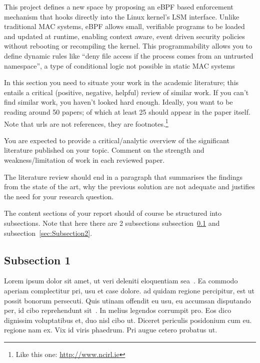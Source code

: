 This project defines a new space by proposing an eBPF based enforcement mechanism that hooks directly into the Linux kernel’s LSM interface. Unlike traditional MAC systems, eBPF allows small, verifiable programs to be loaded and updated at runtime, enabling context aware, event driven security policies without rebooting or recompiling the kernel. This programmability allows you to define dynamic rules like “deny file access if the process comes from an untrusted namespace”, a type of conditional logic not possible in static MAC systems





In this section you need to situate your work in the academic literature; this entails a critical (positive, negative, helpful) review of similar work. If you can't find similar work, you haven't looked hard enough. Ideally, you want to be reading around 50 papers; of which at least 25 should appear in the paper itself. Note that urls are not references, they are footnotes.\footnote{Like this one: \url{http://www.ncirl.ie}}

You are expected to provide a critical/analytic overview of the significant literature published on your topic. Comment on the strength and weakness/limitation of work in each reviewed paper. 

The literature review should end in  a paragraph that summarises the findings from the state of the art, why the previous solution are not adequate and justifies the need for your research question.

The content sections of your report should of course be structured into subsections. Note that here there are 2 subsections subsection~\ref{sec:Subsection1} and subsection~\ref{sec:Subsection2}.

\subsection{Subsection 1}
\label{sec:Subsection1}

Lorem ipsum dolor sit amet, ut veri deleniti eloquentiam sea~\citep{FengB16}. Ea commodo aperiam complectitur pri, usu et case dolore. \citet{KuneKARB16} ad quidam regione percipitur, est ut possit bonorum persecuti. Quis utinam offendit eu usu, eu accumsan disputando per, id cibo reprehendunt sit~\citep{BeloglazovB15,GomesCT15}. In melius legendos corrumpit pro. Eos dico dignissim voluptatibus et, duo nisl cibo ut. Diceret periculis posidonium cum eu. \citet{GomesCT15} regione nam ex. Vix id viris phaedrum. Pri augue cetero probatus ut.

